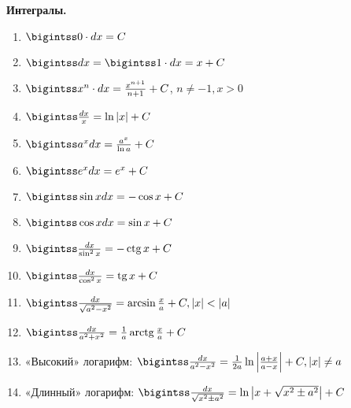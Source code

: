 \textbf{Интегралы.}

\begin{enumerate}

  \item $\bigintss 0 \cdot d x=C$
  \item $\bigintss d x=\bigintss 1 \cdot d x=x+C$
  \item $\bigintss x^{n} \cdot d x=\frac{x^{n+1}}{n+1}+C$, $n \neq-1, x>0$
  \item $\bigintss \frac{d x}{x}=\ln |x|+C$
  \item $\bigintss a^{x} d x=\frac{a^{x}}{\ln a}+C$
  \item $\bigintss e^{x} d x=e^{x}+C$
  \item $\bigintss \sin x d x=-\cos x+C$
  \item $\bigintss \cos x d x=\sin x+C$

  \item $\bigintss \frac{d x}{\sin ^{2} x}=-\operatorname{ctg} x+C$
  \item $\bigintss \frac{d x}{\cos ^{2} x}=\operatorname{tg} x+C$
  \item $\bigintss \frac{d x}{\sqrt{a^{2}-x^{2}}}=\arcsin \frac{x}{a}+C,|x|<|a|$
  \item $\bigintss \frac{d x}{a^{2}+x^{2}}=\frac{1}{a} \operatorname{arctg} \frac{x}{a}+C$
  \item «Высокий» логарифм:
    $\bigintss \frac{d x}{a^{2}-x^{2}}=\frac{1}{2 a} \ln \left|\frac{a+x}{a-x}\right|+C,|x| \neq a$
  \item «Длинный» логарифм:
    $\bigintss \frac{d x}{\sqrt{x^{2} \pm a^{2}}}=\ln \left|x+\sqrt{x^{2} \pm a^{2}}\right|+C$

\end{enumerate}
